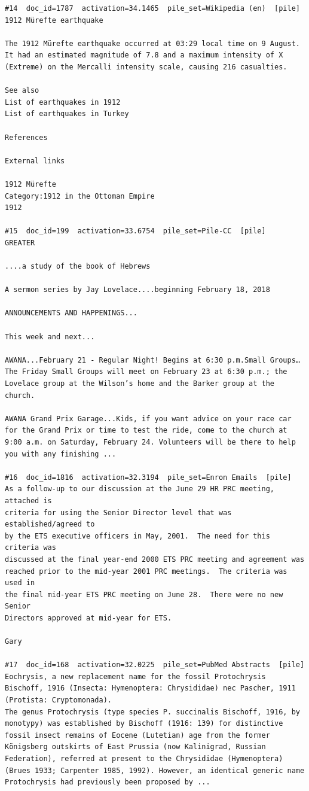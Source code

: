 \begin{verbatim}
#14  doc_id=1787  activation=34.1465  pile_set=Wikipedia (en)  [pile]
1912 Mürefte earthquake

The 1912 Mürefte earthquake occurred at 03:29 local time on 9 August. It had an estimated magnitude of 7.8 and a maximum intensity of X (Extreme) on the Mercalli intensity scale, causing 216 casualties.

See also
List of earthquakes in 1912
List of earthquakes in Turkey

References

External links

1912 Mürefte
Category:1912 in the Ottoman Empire
1912

#15  doc_id=199  activation=33.6754  pile_set=Pile-CC  [pile]
GREATER

....a study of the book of Hebrews

A sermon series by Jay Lovelace....beginning February 18, 2018

ANNOUNCEMENTS AND HAPPENINGS...

This week and next...

AWANA...February 21 - Regular Night! Begins at 6:30 p.m.Small Groups…The Friday Small Groups will meet on February 23 at 6:30 p.m.; the Lovelace group at the Wilson’s home and the Barker group at the church.

AWANA Grand Prix Garage...Kids, if you want advice on your race car for the Grand Prix or time to test the ride, come to the church at 9:00 a.m. on Saturday, February 24. Volunteers will be there to help you with any finishing ...

#16  doc_id=1816  activation=32.3194  pile_set=Enron Emails  [pile]
As a follow-up to our discussion at the June 29 HR PRC meeting, attached is 
criteria for using the Senior Director level that was established/agreed to 
by the ETS executive officers in May, 2001.  The need for this criteria was 
discussed at the final year-end 2000 ETS PRC meeting and agreement was 
reached prior to the mid-year 2001 PRC meetings.  The criteria was used in 
the final mid-year ETS PRC meeting on June 28.  There were no new Senior 
Directors approved at mid-year for ETS.

Gary

#17  doc_id=168  activation=32.0225  pile_set=PubMed Abstracts  [pile]
Eochrysis, a new replacement name for the fossil Protochrysis Bischoff, 1916 (Insecta: Hymenoptera: Chrysididae) nec Pascher, 1911 (Protista: Cryptomonada).
The genus Protochrysis (type species P. succinalis Bischoff, 1916, by monotypy) was established by Bischoff (1916: 139) for distinctive fossil insect remains of Eocene (Lutetian) age from the former Königsberg outskirts of East Prussia (now Kalinigrad, Russian Federation), referred at present to the Chrysididae (Hymenoptera) (Brues 1933; Carpenter 1985, 1992). However, an identical generic name Protochrysis had previously been proposed by ...


\end{verbatim}
